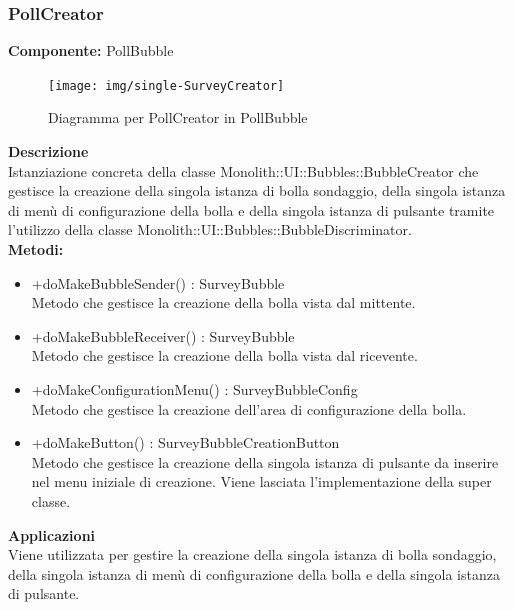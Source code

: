\clearpage

\subsubsection{PollCreator}
\textbf{Componente:}  PollBubble\\
   \FloatBarrier
   \begin{figure}[ht]
   \centering
   \texttt{[image: img/single-SurveyCreator]}
   \caption{{Diagramma per PollCreator in PollBubble}}
\end{figure}
\FloatBarrier
\textbf{Descrizione}\\
Istanziazione concreta della classe Monolith::UI::Bubbles::BubbleCreator che gestisce la creazione della singola istanza di bolla sondaggio, della singola istanza di menù di configurazione della bolla e della singola istanza di pulsante tramite l'utilizzo della classe Monolith::UI::Bubbles::BubbleDiscriminator.
\\
\textbf{Metodi:} 
\begin{itemize}
\item +doMakeBubbleSender() : SurveyBubble 
\\
Metodo che gestisce la creazione della bolla vista dal mittente.
\item +doMakeBubbleReceiver() : SurveyBubble 
\\
Metodo che gestisce la creazione della bolla vista dal ricevente.
\item +doMakeConfigurationMenu() : SurveyBubbleConfig 
\\
Metodo che gestisce la creazione dell'area di configurazione della bolla.
\item +doMakeButton() : SurveyBubbleCreationButton 
\\
Metodo che gestisce la creazione della singola istanza di pulsante da inserire nel menu iniziale di creazione. Viene lasciata l'implementazione della super classe.
\end{itemize} 


\textbf{Applicazioni}\\
Viene utilizzata per gestire la creazione della singola istanza di bolla sondaggio, della singola istanza di menù di configurazione della bolla e della singola istanza di pulsante. 


\clearpage

